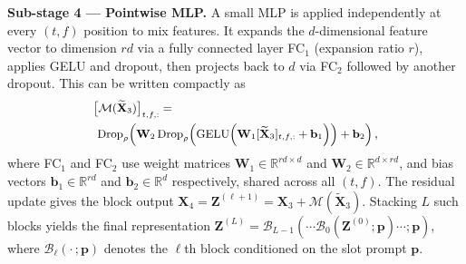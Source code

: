 \documentclass[conference,letterpaper]{IEEEtran}
\begin{document}
	
	\textbf{Sub-stage 4 --- Pointwise MLP.}
	A small MLP is applied independently at every $(t,f)$ position to mix features. It expands the $d$-dimensional feature vector to dimension $rd$ via a fully connected layer FC$_1$ (expansion ratio $r$), applies GELU \cite{gelu} and dropout, then projects back to $d$ via FC$_2$ followed by another dropout. This can be written compactly as
	\begin{equation}
		\small
		\label{eq:pointwise_mlp}
		\begin{aligned}
			\big[\mathcal{M}(\widetilde{\mathbf{X}}_3)\big]_{t,f,:}
			&= \\
			&\hspace{-5.5em}\operatorname{Drop}_{\rho}\!\left(
			\mathbf{W}_2
			\operatorname{Drop}_{\rho}\!\left(
			\operatorname{GELU}\!\left(
			\mathbf{W}_1[\widetilde{\mathbf{X}}_3]_{t,f,:}
			+\mathbf{b}_1
			\right)
			\right)
			+\mathbf{b}_2
			\right),
		\end{aligned}
	\end{equation}
	where FC$_1$ and FC$_2$ use weight matrices $\mathbf{W}_1\in\mathbb{R}^{rd \times d}$ and $\mathbf{W}_2\in\mathbb{R}^{d \times rd}$, and bias vectors $\mathbf{b}_1\in\mathbb{R}^{rd}$ and $\mathbf{b}_2\in\mathbb{R}^{d}$ respectively, shared across all $(t,f)$. The residual update gives the block output $\mathbf{X}_4
	=
	\mathbf{Z}^{(\ell+1)}
	=
	\mathbf{X}_3 + \mathcal{M}(\widetilde{\mathbf{X}}_3).$
	Stacking $L$ such blocks yields the final representation
	$\mathbf{Z}^{(L)} = \mathcal{B}_{L-1}\!\left(\cdots\mathcal{B}_0\!\left(\mathbf{Z}^{(0)};\mathbf{p}\right)\cdots;\mathbf{p}\right)$,
	where $\mathcal{B}_\ell(\cdot\,;\mathbf{p})$ denotes the $\ell$th block conditioned on the slot prompt $\mathbf{p}$.
	
\end{document}

